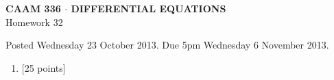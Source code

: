 \documentclass[10pt]{article}
\begin{document}
\vspace*{-5em}
\begin{center}
\large \textsf{\textbf{CAAM 336 $\cdot$ DIFFERENTIAL EQUATIONS}\\[0.5em]
Homework 32 }
\end{center}

Posted Wednesday 23 October 2013.  Due 5pm Wednesday 6 November 2013.

\begin{enumerate}\addtocounter{enumi}{31}
\item {[25 points]}  
\end{enumerate}
\end{document}
